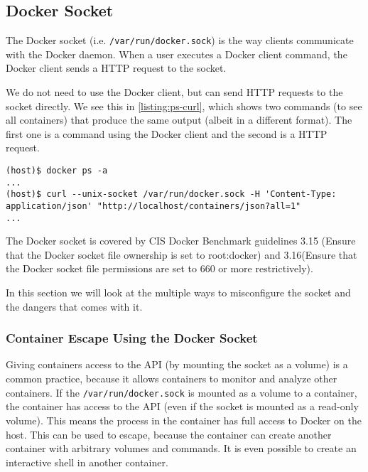 \subsection{Docker Socket}\label{subsection:api}
The Docker socket (i.e. \lstinline{/var/run/docker.sock}) is the way clients communicate with the Docker daemon. When a user executes a Docker client command, the Docker client sends a HTTP request to the socket.

We do not need to use the Docker client, but can send HTTP requests to the socket directly. We see this in \autoref{listing:ps-curl}, which shows two commands (to see all containers) that produce the same output (albeit in a different format). The first one is a command using the Docker client and the second is a HTTP request.
\begin{lstlisting}[caption={Interaction with the Docker daemon with the Docker client and the socket directly.},captionpos=b, label={listing:ps-curl}]
(host)$ docker ps -a
...
(host)$ curl --unix-socket /var/run/docker.sock -H 'Content-Type: application/json' "http://localhost/containers/json?all=1"
...
\end{lstlisting}

\medskip

The Docker socket is covered by CIS Docker Benchmark guidelines 3.15 (Ensure that the Docker socket file ownership is set to root:docker) and 3.16(Ensure that the Docker socket file permissions are set to 660 or more restrictively).

\medskip

In this section we will look at the multiple ways to misconfigure the socket and the dangers\cite{The-Dangers-Of-Docker-Sock} that comes with it.

\subsubsection{Container Escape Using the Docker Socket}
Giving containers access to the API (by mounting the socket as a volume) is a common practice, because it allows containers to monitor and analyze other containers. If the \lstinline{/var/run/docker.sock} is mounted as a volume to a container, the container has access to the API (even if the socket is mounted as a read-only volume\cite{The-Dangers-Of-Docker-Sock}\cite{Read-Only-Docker-Socket-Tweet}\cite{Read-Only-Docker-Socket-Hackernews}). This means the process in the container has full access to Docker on the host. This can be used to escape, because the container can create another container with arbitrary volumes and commands. It is even possible to create an interactive shell in another container\cite{Escape-Socket-Shell}.


